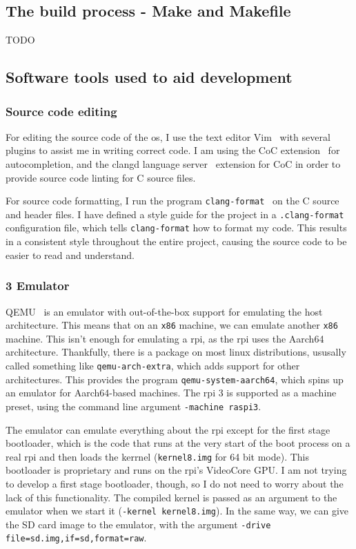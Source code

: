\documentclass{article}
\begin{document}
\subsection{The build process - Make and Makefile}
TODO

\subsection{Software tools used to aid development}
\subsubsection{Source code editing}
For editing the source code of the \gls{os}, I use the text editor
Vim~\cite{vim} with several plugins to assist me in writing correct code. I am
using the CoC extension~\cite{vim-coc} for autocompletion, and the clangd
language server~\cite{clangd} extension for CoC in order to provide source code
linting for C source files.

For source code formatting, I run the program
\texttt{clang-format}~\cite{clang-format} on the C source and header files. I
have defined a style guide for the project in a \texttt{.clang-format}
configuration file, which tells \texttt{clang-format} how to format my code.
This results in a consistent style throughout the entire project, causing the
source code to be easier to read and understand.

\subsubsection{\texorpdfstring{}{RPi} 3 Emulator}
QEMU~\cite{qemu} is an emulator with out-of-the-box support for emulating the
host architecture. This means that on an \texttt{x86} machine, we can
emulate another \texttt{x86} machine. This isn't enough for emulating a
\gls{rpi}, as the \gls{rpi} uses the Aarch64 architecture. Thankfully, there is
a package on most linux distributions, ususally called something like
\texttt{qemu-arch-extra}, which adds support for other architectures. This
provides the program \texttt{qemu-system-aarch64}, which spins up an emulator
for Aarch64-based machines. The \gls{rpi} 3 is supported as a machine preset,
using the command line argument \texttt{-machine raspi3}.

The emulator can emulate everything about the \gls{rpi} except for the first
stage bootloader, which is the code that runs at the very start of the boot
process on a real \gls{rpi} and then loads the kerrnel (\texttt{kernel8.img}
for 64 bit mode). This bootloader is proprietary and runs on the \gls{rpi}'s
VideoCore GPU. I am not trying to develop a first stage bootloader, though, so
I do not need to worry about the lack of this functionality. The compiled
kernel is passed as an argument to the emulator when we start it
(\texttt{-kernel kernel8.img}). In the same way, we can give the SD card image
to the emulator, with the argument \texttt{-drive
file=sd.img,if=sd,format=raw}.
\end{document}
